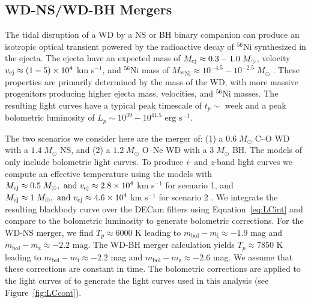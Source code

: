 \subsection{WD-NS/WD-BH Mergers}
\label{sec:WDmerge}
The tidal disruption of a WD by a NS or BH binary companion can produce an isotropic optical transient powered by the radioactive decay of ${}^{56}$Ni synthesized in the ejecta. The ejecta have an expected mass of $M_{\rm ej} \approx 0.3-1.0 \; M_{\odot}$, velocity $v_{\rm ej} \approx (1-5) \times 10^4$ km s$^{-1}$, and $^{56}$Ni mass of $M_{\text{$^{56}$Ni}} \approx 10^{-4.5} - 10^{-2.5}\;M_{\odot}$ \citep{Metzger2012}. These properties are primarily determined by the mass of the WD, with more massive progenitors producing higher ejecta mass, velocities, and $^{56}$Ni masses. The resulting light curves have a typical peak timescale of $t_p \sim $ week and a peak bolometric luminosity of $L_p \sim 10^{39} - 10^{41.5} \text{ erg s}^{-1}$.

The two scenarios we consider here are the merger of: (1) a $0.6\;M_{\odot}$ C--O WD with a $1.4\;M_{\odot}$ NS, and (2) a $1.2\;M_{\odot}$ O--Ne WD with a $3\;M_{\odot}$ BH. The models of \citet{Metzger2012} only include bolometric light curves. To produce {\em i}- and {\em z}-band light curves we compute an effective temperature using the  models with $M_{\rm ej} \approx 0.5\;M_{\odot},\text{ and }v_{\rm ej} \approx 2.8\times10^4$ km s$^{-1}$ for scenario 1, and $M_{\rm ej} \approx 1\;M_{\odot},\text{ and } v_{\rm ej} \approx 4.6\times10^4$ km s$^{-1}$ for scenario 2 \citep[see Figure 7 of][]{Metzger2012}. We integrate the resulting blackbody curve over the DECam filters using Equation~\ref{eq:LCint} and compare to the bolometric luminosity to generate bolometric corrections. For the WD-NS merger, we find $T_p \approx 6000$ K leading to $m_{\text{bol}} - m_{\text{i}} \approx -1.9$ mag and $m_{\text{bol}} - m_{\text{z}} \approx -2.2$ mag. The WD-BH merger calculation yields $T_p \approx 7850$ K leading to $m_{\text{bol}} - m_{\text{i}} \approx -2.2$ mag and $m_{\text{bol}} - m_{\text{z}} \approx -2.6$ mag. We assume that these corrections are constant in time. The bolometric corrections are applied to the light curves of \citet{Metzger2012} to generate the light curves used in this analysis (see Figure~\ref{fig:LCcont}).


